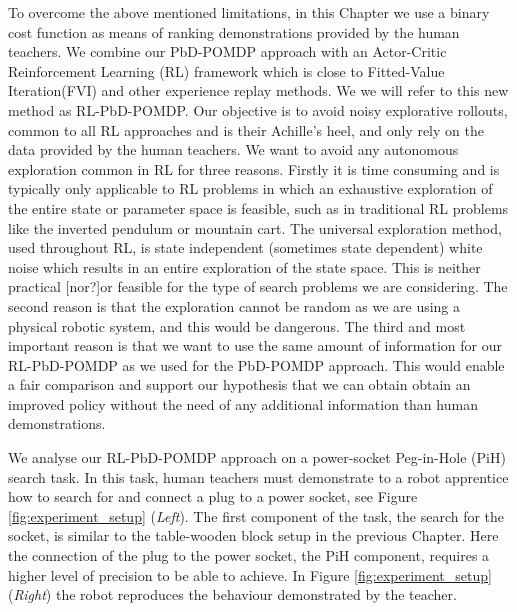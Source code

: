 
To overcome the above mentioned limitations, in this Chapter we use a binary cost function as means of ranking demonstrations 
provided by the human teachers. We combine our PbD-POMDP approach with an Actor-Critic Reinforcement Learning (RL) framework which 
is close to Fitted-Value Iteration(FVI) and other experience replay methods. We we will refer to this new method as RL-PbD-POMDP. 
Our objective is to avoid noisy explorative rollouts, common to all RL approaches and is their Achille's heel, and only rely on 
the data provided by the human teachers. We want to avoid any autonomous exploration common in RL for three reasons. 
Firstly it is time consuming and is typically only applicable to RL problems in which an exhaustive exploration 
of the entire state or parameter space is feasible, such as in traditional RL problems like the inverted pendulum or mountain cart. 
The universal exploration method, used throughout RL, is state independent (sometimes state dependent) white noise 
which results in an entire exploration of the state space. This
is neither practical [nor?]or feasible for the type of search problems we are considering. The second reason is that the 
exploration cannot be random as we are using a physical robotic system, and this would be dangerous. The third and
most important reason is that we want to use the same amount of information for our RL-PbD-POMDP as we used 
for the PbD-POMDP approach.  This would enable a fair comparison and support our hypothesis that we can obtain 
obtain an improved policy without the need of any additional information than human demonstrations.

We analyse our RL-PbD-POMDP approach on a power-socket Peg-in-Hole (PiH) search task. In this task, human teachers must demonstrate 
to a robot apprentice how to search for and connect a plug to a power socket, see Figure \ref{fig:experiment_setup} (\textit{Left}). 
The first component of the task, the search for the socket, is similar to the table-wooden block setup in the previous Chapter. 
Here the connection of the plug to the power socket, the PiH component, requires a higher level of precision to be able to achieve.
In Figure \ref{fig:experiment_setup} (\textit{Right}) the robot reproduces the behaviour demonstrated by the teacher.

